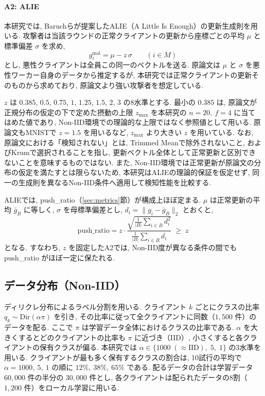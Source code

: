 \documentclass[a4j, dvipdfmx]{jsarticle}
\newcommand{\PushRatio}{\textrm{push\_ratio}}
\begin{document}
\paragraph{A2: ALIE}
本研究では, Baruchら\cite{baruch2019little}が提案したALIE（A Little Is Enough）の更新生成則を用いる. 攻撃者は当該ラウンドの正常クライアントの更新から座標ごとの平均 $\mu$ と標準偏差 $\sigma$ を求め,
\begin{equation}
g_i^{\text{mal}} = \mu - z\,\sigma \qquad (i \in M)
\label{eq:alie}
\end{equation}
とし, 悪性クライアントは全員この同一のベクトルを送る. 原論文は $\mu$ と $\sigma$ を悪性ワーカー自身のデータから推定するが, 本研究では正常クライアントの更新そのものから求めており, 原論文より強い攻撃者を想定している.

$z$ は $0.385$, $0.5$, $0.75$, $1$, $1.25$, $1.5$, $2$, $3$ の8水準とする. 最小の $0.385$ は, 原論文が正規分布の仮定の下で定めた摂動の上限 $z_{\max}$ を本研究の $n=20,\ f=4$ に当てはめた値であり, Non-IID環境での理論的な上限ではなく参照値として用いる. 原論文もMNISTで $z=1.5$ を用いるなど, $z_{\max}$ より大きい $z$ を用いている. なお, 原論文における「検知されない」とは, Trimmed Meanで除外されないこと, およびKrumで選択されることを指し, 更新ベクトル全体として正常更新と区別できないことを意味するものではない. また, Non-IID環境では正常更新が原論文の分布の仮定を満たすとは限らないため, 本研究はALIEの理論的保証を仮定せず, 同一の生成則を異なるNon-IID条件へ適用して検知性能を比較する.

ALIEでは, \PushRatio{}（\ref{sec:metrics}節）が構成上ほぼ定まる. $\mu$ は正常更新の平均 $\bar{g}_B$ に等しく, $\sigma$ を母標準偏差とし, $d_i = \|g_i - \bar{g}_B\|_2$ とおくと,
\begin{equation}
\PushRatio
= z \cdot \frac{\sqrt{\frac{1}{|B|}\sum_{i \in B} d_i^2}}{\frac{1}{|B|}\sum_{i \in B} d_i}
\;\ge\; z
\label{eq:alie-pushratio}
\end{equation}
となる. すなわち, $z$ を固定したA2では, Non-IID度が異なる条件の間でも \PushRatio{} がほぼ一定に保たれる.

\subsection{データ分布（Non-IID）}
\label{sec:data-noniid}

ディリクレ分布によるラベル分割\cite{hsu2019measuring}を用いる. クライアント $k$ ごとにクラスの比率 $q_k \sim \mathrm{Dir}(\alpha \pi)$ を引き, その比率に従って全クライアントに同数（$1{,}500$ 件）のデータを配る. ここで $\pi$ は学習データ全体におけるクラスの比率である. $\alpha$ を大きくするとどのクライアントの比率も $\pi$ に近づき（IID）, 小さくすると各クライアントの保有クラスが偏る. 本研究では $\alpha \in \{1000\;(\approx\text{IID}),\; 5,\; 1\}$ の3水準を用いる. クライアントが最も多く保有するクラスの割合は, 10試行の平均で $\alpha=1000,\ 5,\ 1$ の順に $12\%,\ 38\%,\ 65\%$ である. 配るデータの合計は学習データ $60{,}000$ 件の半分の $30{,}000$ 件とし, 各クライアントは配られたデータの8割（$1{,}200$ 件）をローカル学習に用いる.
\end{document}
